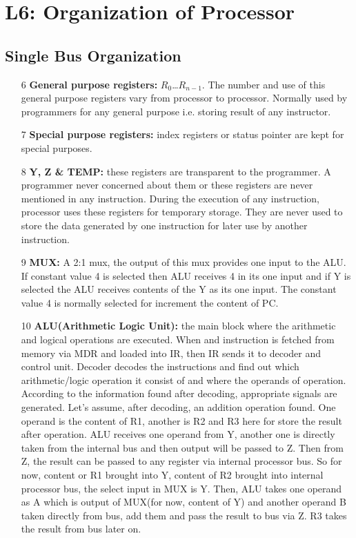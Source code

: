 \documentclass[12 pt, letterpaper]{extarticle}
\begin{document}
\section*{L6: Organization of Processor}
\subsection*{Single Bus Organization}
\begin{enumerate}
	\item[6] \textbf{General purpose registers:} $R_0$\dots$R_{n-1}$. The number and use of this general purpose registers vary from processor to processor. Normally used by programmers for any general purpose i.e. storing result of any instructor.
	\item[7] \textbf{Special purpose registers:} index registers or status pointer are kept for special purposes.
	\item[8] \textbf{Y, Z \& TEMP:} these registers are transparent to the programmer. A programmer never concerned about them or these registers are never mentioned in any instruction. During the execution of any instruction, processor uses these registers for temporary storage. They are never used to store the data generated by one instruction for later use by another instruction.
	\item[9] \textbf{MUX:} A 2:1 mux, the output of this mux provides one input to the ALU. If constant value 4 is selected then ALU receives 4 in its one input and if Y is selected the ALU receives contents of the Y as its one input. The constant value 4 is normally selected for increment the content of PC.
	\item[10] \textbf{ALU(Arithmetic Logic Unit):} the main block where the arithmetic and logical operations are executed. When and instruction is fetched from memory via MDR and loaded into IR, then IR sends it to decoder and control unit. Decoder decodes the instructions and find out which arithmetic/logic operation it consist of and where the operands of operation. According to the information found after decoding, appropriate signals are generated. Let's assume, after decoding, an addition operation found. One operand is the content of R1, another is R2 and R3 here for store the result after operation. ALU receives one operand from Y, another one is directly taken from the internal bus and then output will be passed to Z. Then from Z, the result can be passed to any register via internal processor bus. So for now, content or R1 brought into Y, content of R2 brought into internal processor bus, the select input in MUX is Y. Then, ALU takes one operand as A which is output of MUX(for now, content of Y) and another operand B taken directly from bus, add them and pass the result to bus via Z. R3 takes the result from bus later on.
\end{enumerate}
\end{document}
